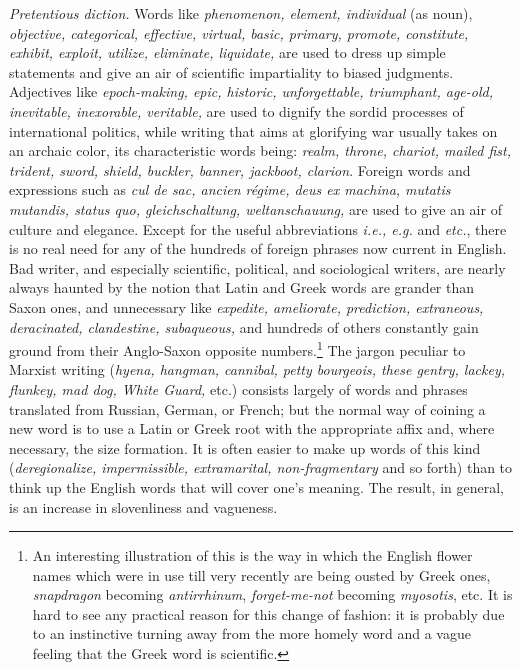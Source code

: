 \documentclass[a4paper]{article}
\begin{document}
\textit{Pretentious diction.} Words like \textit{phenomenon, element, individual} (as noun), \textit{objective, categorical, effective, virtual, basic, primary, promote, constitute, exhibit, exploit, utilize, eliminate, liquidate,} are used to dress up simple statements and give an air of scientific impartiality to biased judgments. Adjectives like \textit{epoch-making, epic, historic, unforgettable, triumphant, age-old, inevitable, inexorable, veritable,} are used to dignify the sordid processes of international politics, while writing that aims at glorifying war usually takes on an archaic color, its characteristic words being: \textit{realm, throne, chariot, mailed fist, trident, sword, shield, buckler, banner, jackboot, clarion}. Foreign words and expressions such as \textit{cul de sac, ancien régime, deus ex machina, mutatis mutandis, status quo, gleichschaltung, weltanschauung,} are used to give an air of culture and elegance. Except for the useful abbreviations \textit{i.e., e.g.} and \textit{etc.}, there is no real need for any of the hundreds of foreign phrases now current in English. Bad writer, and especially scientific, political, and sociological writers, are nearly always haunted by the notion that Latin and Greek words are grander than Saxon ones, and unnecessary like \textit{expedite, ameliorate, prediction, extraneous, deracinated, clandestine, subaqueous,} and hundreds of others constantly gain ground from their Anglo-Saxon opposite numbers.\footnote{An interesting illustration of this is the way in which the English flower names which were in use till very recently are being ousted by Greek ones, \textit{snapdragon} becoming \textit{antirrhinum}, \textit{forget-me-not} becoming \textit{myosotis}, etc. It is hard to see any practical reason for this change of fashion: it is probably due to an instinctive turning away from the more homely word and a vague feeling that the Greek word is scientific.} The jargon peculiar to Marxist writing (\textit{hyena, hangman, cannibal, petty bourgeois, these gentry, lackey, flunkey, mad dog, White Guard,} etc.) consists largely of words and phrases translated from Russian, German, or French; but the normal way of coining a new word is to use a Latin or Greek root with the appropriate affix and, where necessary, the size formation. It is often easier to make up words of this kind (\textit{deregionalize, impermissible, extramarital, non-fragmentary} and so forth) than to think up the English words that will cover one's meaning. The result, in general, is an increase in slovenliness and vagueness.
\end{document}
